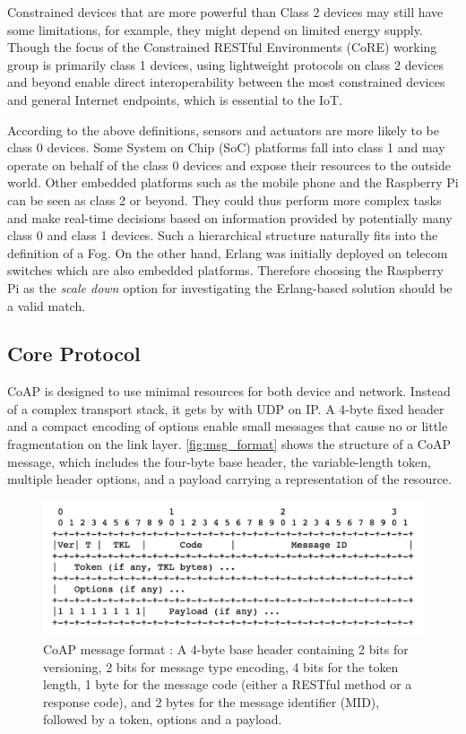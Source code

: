 Constrained devices that are more powerful than Class 2 devices may still have some limitations, for example, they might depend on limited energy supply. Though the focus of the Constrained RESTful Environments (CoRE) working group is primarily class 1 devices, using lightweight protocols on class 2 devices and beyond enable direct interoperability between the most constrained devices and general Internet endpoints, which is essential to the IoT.

According to the above definitions, sensors and actuators are more likely to be class 0 devices. Some System on Chip (SoC) platforms fall into class 1 and may operate on behalf of the class 0 devices and expose their resources to the outside world. Other embedded platforms such as the mobile phone and the Raspberry Pi \autocite{raspberry_pi} can be seen as class 2 or beyond. They could thus perform more complex tasks and make real-time decisions based on information provided by potentially many class 0 and class 1 devices. Such a hierarchical structure naturally fits into the definition of a Fog. On the other hand, Erlang was initially deployed on telecom switches which are also embedded platforms. Therefore choosing the Raspberry Pi as the \textit{scale down} option for investigating the Erlang-based solution should be a valid match.

\subsection{Core Protocol} \label{core_protocol}

CoAP is designed to use minimal resources for both device and network. Instead of a complex transport stack, it gets by with UDP on IP. A 4-byte fixed header and a compact encoding of options enable small messages that cause no or little fragmentation on the link layer. \autoref{fig:msg_format} shows the structure of a CoAP message, which includes the four-byte base header, the variable-length token, multiple header options, and a payload carrying a representation of the resource.

\begin{figure}[!htbp]
\centering
\includegraphics[scale = 0.55]{msg_format.png}
\caption[CoAP message format]{CoAP message format \autocite{coap_protocol}: A 4-byte base header containing 2 bits for versioning, 2 bits for message type encoding, 4 bits for the token length, 1 byte for the message code (either a RESTful method or a response code), and 2 bytes for the message identifier (MID), followed by a token, options and a payload.}
\label{fig:msg_format}
\end{figure}

